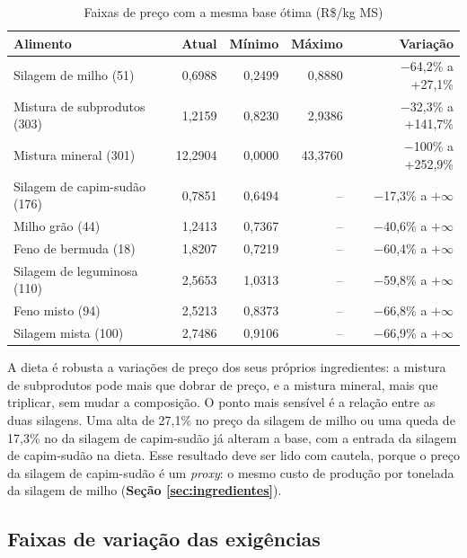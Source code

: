 \documentclass[a4paper,12pt]{article}
\begin{document}
\begin{table}[htbp]
    \centering
    \caption{Faixas de preço com a mesma base ótima (R\$/kg MS)}
    \label{tab:faixascusto}
    \begin{tabular}{lrrrr}
        \toprule
        \textbf{Alimento} & \textbf{Atual} & \textbf{Mínimo} & \textbf{Máximo} & \textbf{Variação} \\
        \midrule
        \rowcolor{gray!15}
        Silagem de milho (51) & 0,6988 & 0,2499 & 0,8880 & $-$64,2\% a +27,1\% \\
        Mistura de subprodutos (303) & 1,2159 & 0,8230 & 2,9386 & $-$32,3\% a +141,7\% \\
        \rowcolor{gray!15}
        Mistura mineral (301) & 12,2904 & 0,0000 & 43,3760 & $-$100\% a +252,9\% \\
        \midrule
        Silagem de capim-sudão (176) & 0,7851 & 0,6494 & -- & $-$17,3\% a $+\infty$ \\
        \rowcolor{gray!15}
        Milho grão (44) & 1,2413 & 0,7367 & -- & $-$40,6\% a $+\infty$ \\
        Feno de bermuda (18) & 1,8207 & 0,7219 & -- & $-$60,4\% a $+\infty$ \\
        \rowcolor{gray!15}
        Silagem de leguminosa (110) & 2,5653 & 1,0313 & -- & $-$59,8\% a $+\infty$ \\
        Feno misto (94) & 2,5213 & 0,8373 & -- & $-$66,8\% a $+\infty$ \\
        \rowcolor{gray!15}
        Silagem mista (100) & 2,7486 & 0,9106 & -- & $-$66,9\% a $+\infty$ \\
        \bottomrule
    \end{tabular}
\end{table}

A dieta é robusta a variações de preço dos seus próprios ingredientes: a mistura de subprodutos pode mais que dobrar de preço, e a mistura mineral, mais que triplicar, sem mudar a composição. O ponto mais sensível é a relação entre as duas silagens. Uma alta de 27,1\% no preço da silagem de milho ou uma queda de 17,3\% no da silagem de capim-sudão já alteram a base, com a entrada da silagem de capim-sudão na dieta. Esse resultado deve ser lido com cautela, porque o preço da silagem de capim-sudão é um \textit{proxy}: o mesmo custo de produção por tonelada da silagem de milho (\textbf{Seção \ref{sec:ingredientes}}).

\subsection{Faixas de variação das exigências}
\end{document}
